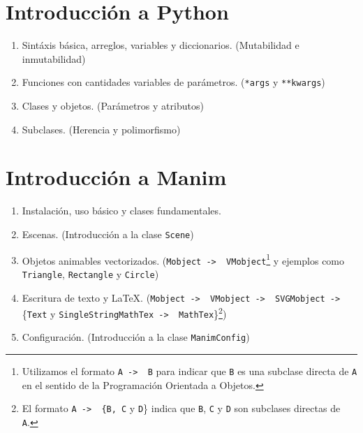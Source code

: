 \documentclass[a4paper]{article}
\begin{document}
\setcounter{section}{-1}

\section{Introducción a Python} \label{Sec: Introducción a la programación (2 semanas)} 

\begin{enumerate}[label=\arabic*.]

    \item Sintáxis básica, arreglos, variables y diccionarios. (Mutabilidad e inmutabilidad)

    \item Funciones con cantidades variables de parámetros. (\texttt{*args} y \texttt{**kwargs})

    \item Clases y objetos. (Parámetros y atributos)

    \item Subclases. (Herencia y polimorfismo)
\end{enumerate}

\section{Introducción a Manim} \label{Sec: Introducción a Manim}

\begin{enumerate}

    \item Instalación, uso básico y clases fundamentales.

    \item Escenas. (Introducción a la clase \texttt{Scene})

    \item Objetos animables vectorizados. (\texttt{Mobject -> \ VMobject}\footnote{Utilizamos el formato \texttt{A -> \ B} para indicar que \texttt{B} es una subclase directa de \texttt{A} en el sentido de la Programación Orientada a Objetos.} y ejemplos como \texttt{Triangle}, \texttt{Rectangle} y \texttt{Circle})

    \item Escritura de texto y \LaTeX. (\texttt{Mobject -> \ VMobject -> \ SVGMobject ->} \{\texttt{Text} y \texttt{SingleStringMathTex -> \ MathTex}\}\footnote{El formato \texttt{A -> \ \{B, C} y \texttt{D}\} indica que \texttt{B}, \texttt{C} y \texttt{D} son subclases directas de \texttt{A}.})

    \item Configuración. (Introducción a la clase \texttt{ManimConfig})
\end{enumerate}
\end{document}
